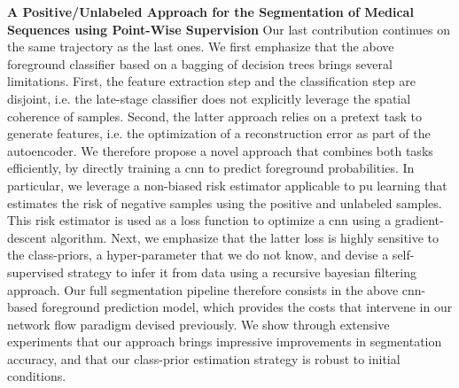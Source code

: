 \textbf{A Positive/Unlabeled Approach for the
Segmentation of Medical Sequences using
Point-Wise Supervision}
Our last contribution continues on the same trajectory as the last ones.
We first emphasize that the above foreground classifier based on a bagging of decision trees brings several limitations.
First, the feature extraction step and the classification step are disjoint, i.e. the late-stage classifier does not explicitly leverage the spatial coherence of samples.
Second, the latter approach relies on a pretext task to generate features, i.e. the optimization of a reconstruction error as part of the autoencoder.
We therefore propose a novel approach that combines both tasks efficiently, by directly training a \gls{cnn} to predict foreground probabilities.
In particular, we leverage a non-biased risk estimator applicable to \gls{pu} learning that estimates the risk of negative samples using the positive and unlabeled samples.
This risk estimator is used as a loss function to optimize a \gls{cnn} using a gradient-descent algorithm.
Next, we emphasize that the latter loss is highly sensitive to the class-priors, a hyper-parameter that we do not know, and devise a self-supervised strategy to infer it from data using a recursive bayesian filtering approach.
Our full segmentation pipeline therefore consists in the above \gls{cnn}-based foreground prediction model, which provides the costs that intervene in our network flow paradigm devised previously.
We show through extensive experiments that our approach brings impressive improvements in segmentation accuracy, and that our class-prior estimation strategy is robust to initial conditions.

